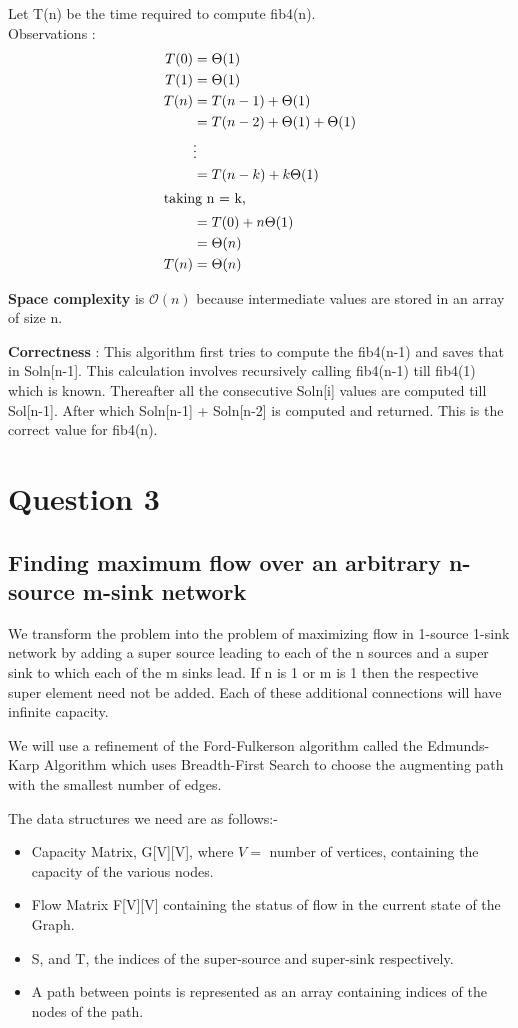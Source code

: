 \documentclass{article}
\begin{document}
Let T(n) be the time required to compute fib4(n). \\
Observations : \\
\begin{align*}
T(0) & = \Theta(1) \\
T(1) & = \Theta(1) \\
T(n) & = T(n-1) + \Theta(1) \\
& = T(n-2) + \Theta(1) + \Theta(1) \\
& \vdots \\
& = T(n-k) + k\Theta(1) \\
\intertext{taking n = k,}
& = T(0) + n\Theta(1) \\
& = \Theta(n) \\
T(n) & = \Theta(n)\\
\end{align*}

\textbf{Space complexity} is $\mathcal{O}(n)$ because intermediate values are stored in an array of size n.

\textbf{Correctness} : This algorithm first tries to compute the fib4(n-1) and saves that in Soln[n-1]. This calculation involves recursively calling fib4(n-1) till fib4(1) which is known. Thereafter all the consecutive Soln[i] values are computed till Sol[n-1]. After which Soln[n-1] + Soln[n-2] is computed and returned. This is the correct value for fib4(n).

\newpage
\section{Question 3}
\subsection{Finding maximum flow over an arbitrary n-source m-sink network}
We transform the problem into the problem of maximizing flow in 1-source 1-sink  network by adding a super source leading to each of the n sources and a super sink to which each of the m sinks lead. If n is 1 or m is 1 then the respective super element need not be added. Each of these additional connections will have infinite capacity.

We will use a refinement of the Ford-Fulkerson algorithm called the Edmunds-Karp Algorithm which uses Breadth-First Search to choose the augmenting path with the smallest number of edges.

The data structures we need are as follows:-
\begin{itemize}
\item Capacity Matrix, G[V][V], where $V = $ number of vertices, containing the capacity of the various nodes.
\item Flow Matrix F[V][V] containing the status of flow in the current state of the Graph.
\item S, and T, the indices of the super-source and super-sink respectively.
\item A path between points is represented as an array containing indices of the nodes of the path. 
\end{itemize}
\end{document}

